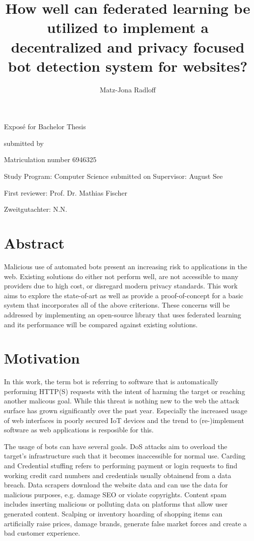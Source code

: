 \documentclass[
    fontsize=12pt,
    headings=small,
    parskip=half,           %
    bibliography=totoc,
    numbers=noenddot,       %
    open=any,               %
    ]{scrreprt}
\title{How well can federated learning be utilized to implement a decentralized and privacy focused bot detection system for websites?}
\author{Matz-Jona Radloff}
\begin{document}
\begin{titlepage}
\begin{center}\Large
	\vfill
    Exposé for Bachelor Thesis
	\vfill
	\makeatletter
	{\Large\textsf{\textbf{\@title}}\par}
	\makeatother
	\vfill
    submitted by
	\par\bigskip
	\makeatletter
	{\@author} \par
	\makeatother
	Matriculation number 6946325 \par
	Study Program: Computer Science
	\vfill
	\makeatletter
	submitted on {\@date}
	\makeatother
	\vfill
	Supervisor: August See\par
	First reviewer: Prof. Dr. Mathias Fischer \par
	Zweitgutachter: N.N.
\end{center}
\end{titlepage}


\chapter*{Abstract}

Malicious use of automated bots present an increasing risk to applications in the web. Existing solutions do either not perform well, are not accessible to many providers due to high cost, or disregard modern privacy standards. This work aims to explore the state-of-art as well as provide a proof-of-concept for a basic system that incorporates all of the above criterions. These concerns will be addressed by implementing an open-source library that uses federated learning and its performance will be compared against existing solutions.

\tableofcontents

\chapter{Motivation}

In this work, the term bot is referring to software that is automatically performing HTTP(S) requests with the intent of harming the target or reaching another malicous goal. While this threat is nothing new to the web the attack surface has grown significantly over the past year. Especially the increased usage of web interfaces in poorly secured IoT devices and the trend to (re-)implement software as web applications is resposible for this.

The usage of bots can have several goals. DoS attacks aim to overload the target's infrastructure such that it becomes inaccessible for normal use. Carding and Credential stuffing refers to performing payment or login requests to find working credit card numbers and credentials usually obtainend from a data breach. Data scrapers download the website data and can use the data for malicious purposes, e.g. damage SEO or violate copyrights. Content spam includes inserting malicious or polluting data on platforms that allow user generated content. Scalping or inventory hoarding of shopping items can artificially raise prices, damage brands, generate false market forces and create a bad customer experience.
\end{document}

